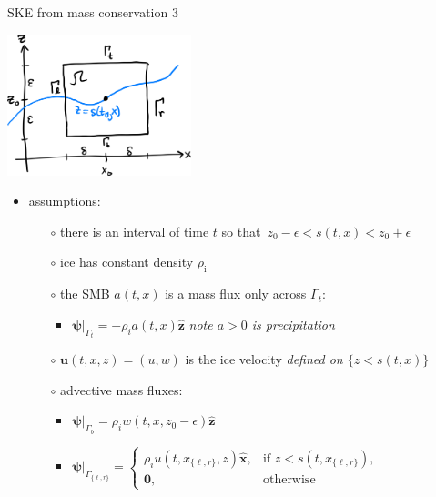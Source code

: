 \documentclass[10pt,dvipsnames]{beamer}
\newcommand{\bu}{\mathbf{u}}
\newcommand{\hbx}{\hat{\mathbf{x}}}
\newcommand{\hbz}{\hat{\mathbf{z}}}
\newcommand{\bpsi}{\bm{\psi}}
\newcommand{\bzero}{\bm{0}}
\newcommand{\eps}{\epsilon}
\newcommand{\rhoi}{\rho_{\text{i}}}
\newcommand{\comm}[1]{{\footnotesize \hfill \emph{#1}}}
\begin{document}
\begin{frame}{SKE from mass conservation 3}
\begin{center}
\includegraphics[width=0.4\textwidth]{skederive.png}
\end{center}

\vspace{-3mm}

\begin{itemize}
\item assumptions:
    \begin{itemize}
    \item[$\circ$] there is an interval of time $t$ so that \,$z_0-\eps < s(t,x) < z_0 + \eps$
    \item[$\circ$] ice has constant density $\rhoi$
    \item[$\circ$] the SMB $a(t,x)$ is a mass flux only across $\Gamma_t$:
        \begin{itemize}
        \item $\bpsi\big|_{\Gamma_t} = - \rho_i a(t,x) \hbz$  \comm{note $a>0$ is precipitation}
        \end{itemize}
    \item[$\circ$] $\bu(t,x,z)=(u,w)$ is the ice velocity \comm{defined on $\{z<s(t,x)\}$}
    \item[$\circ$] advective mass fluxes:
        \begin{itemize}
        \item $\bpsi\big|_{\Gamma_b} = \rho_i w(t,x,z_0-\eps) \hbz$
        \item $\bpsi\big|_{\Gamma_{\{\ell,r\}}} = \begin{cases} \rho_i u(t,x_{\{\ell,r\}},z) \hbx, & \text{if } z < s(t,x_{\{\ell,r\}}), \\ \bzero, & \text{otherwise} \end{cases}$
        \end{itemize}
    \end{itemize}
\end{itemize}
\end{frame}
\end{document}
